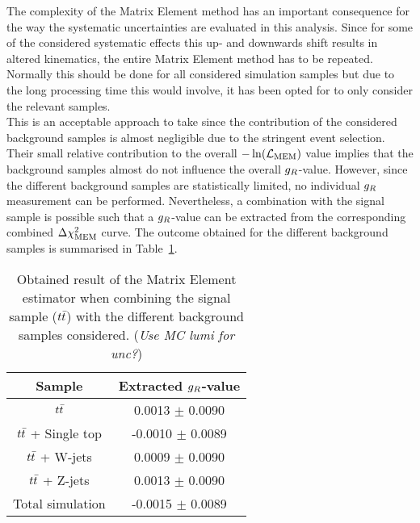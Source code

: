 The complexity of the Matrix Element method has an important consequence for the way the systematic uncertainties are evaluated in this analysis.
Since for some of the considered systematic effects this up- and downwards shift results in altered kinematics, the entire Matrix Element method has to be repeated.
Normally this should be done for all considered simulation samples but due to the long processing time this would involve, it has been opted for to only consider the relevant samples.
\\
This is an acceptable approach to take since the contribution of the considered background samples is almost negligible due to the stringent event selection.
Their small relative contribution to the overall $-\ln(\mathcal{L}_{\textrm{MEM}})$ value implies that the background samples almost do not influence the overall $g_{R}$-value.
However, since the different background samples are statistically limited, no individual $g_{R}$ measurement can be performed. 
Nevertheless, a combination with the signal sample is possible such that a $g_{R}$-value can be extracted from the corresponding combined $\Delta \chi^{2}_{\textrm{MEM}}$ curve.
The outcome obtained for the different background samples is summarised in Table~\ref{table::BckInfl}.
\\
\begin{table}[h!t]
 \centering
 \caption{Obtained result of the Matrix Element estimator when combining the signal sample ($t\bar{t}$) with the different background samples considered. (\textit{Use MC lumi for unc?})} \label{table::BckInfl}
 \renewcommand{\arraystretch}{1.2}
 \begin{tabular}{|c|c|}
  \hline
  Sample 			& Extracted $g_{R}$-value 			\\
  \hline
  $t\bar{t}$ 			&  0.0013 $\pm$ 0.0090		\\
  $t\bar{t}$ + Single top 	&  -0.0010 $\pm$ 0.0089		\\
  $t\bar{t}$ + W-jets  		&  0.0009 $\pm$ 0.0090		\\
  $t\bar{t}$ + Z-jets 	 	&  0.0013 $\pm$ 0.0090		\\
  \hline
  Total simulation 		& -0.0015 $\pm$ 0.0089 		\\
  \hline
 \end{tabular}
\end{table}

